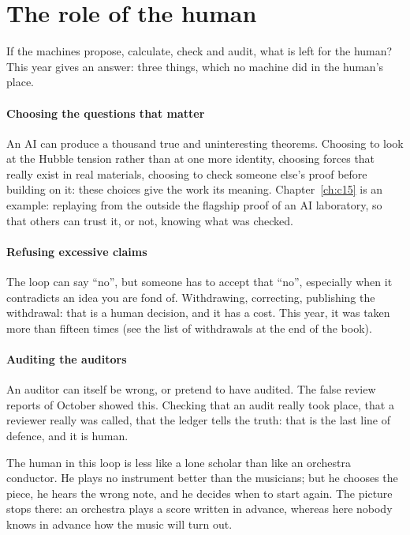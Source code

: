 \section{The role of the human}

If the machines propose, calculate, check and audit, what is left for the human? This year gives an answer: three
things, which no machine did in the human's place.

\paragraph{Choosing the questions that matter} An AI can produce a thousand true and uninteresting theorems. Choosing to
look at the Hubble tension rather than at one more identity, choosing forces that really exist in real materials,
choosing to check someone else's proof before building on it: these choices give the work its meaning.
Chapter~\ref{ch:c15} is an example: replaying from the outside the flagship proof of an AI laboratory, so that others
can trust it, or not, knowing what was checked.

\paragraph{Refusing excessive claims} The loop can say ``no'', but someone has to accept that ``no'', especially when
it contradicts an idea you are fond of. Withdrawing, correcting, publishing the withdrawal: that is a human decision,
and it has a cost. This year, it was taken more than fifteen times (see the list of withdrawals at the end of the
book).

\paragraph{Auditing the auditors} An auditor can itself be wrong, or pretend to have audited. The false review reports
of October showed this. Checking that an audit really took place, that a reviewer really was called, that the ledger
tells the truth: that is the last line of defence, and it is human.

\begin{analogie}
The human in this loop is less like a lone scholar than like an orchestra conductor. He plays no instrument better
than the musicians; but he chooses the piece, he hears the wrong note, and he decides when to start again. The picture
stops there: an orchestra plays a score written in advance, whereas here nobody knows in advance how the music will
turn out.
\end{analogie}

